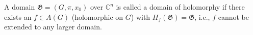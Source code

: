A domain $\mathfrak{G} = (G, \pi, x_0)$ over $\mathbb{C}^n$ is called a domain of holomorphy if there exists an $f \in A(G)$ (holomorphic on $G$) with $H_f(\mathfrak{G}) = \mathfrak{G}$, i.e., $f$ cannot be extended to any larger domain.
